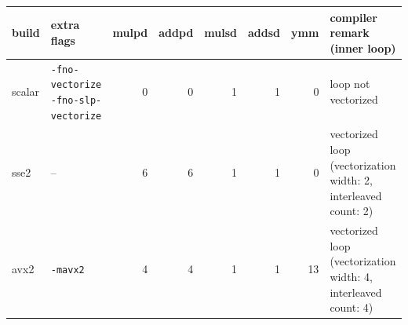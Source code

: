 \begin{tabular}{llrrrrrl}
\toprule
build & extra flags & mulpd & addpd & mulsd & addsd & ymm & compiler remark (inner loop) \\
\midrule
scalar & \texttt{-fno-vectorize -fno-slp-vectorize} & 0 & 0 & 1 & 1 & 0 & \parbox[t]{5.2cm}{\raggedright\footnotesize loop not vectorized} \\
sse2 & -- & 6 & 6 & 1 & 1 & 0 & \parbox[t]{5.2cm}{\raggedright\footnotesize vectorized loop (vectorization width: 2, interleaved count: 2)} \\
avx2 & \texttt{-mavx2} & 4 & 4 & 1 & 1 & 13 & \parbox[t]{5.2cm}{\raggedright\footnotesize vectorized loop (vectorization width: 4, interleaved count: 4)} \\
\bottomrule
\end{tabular}
